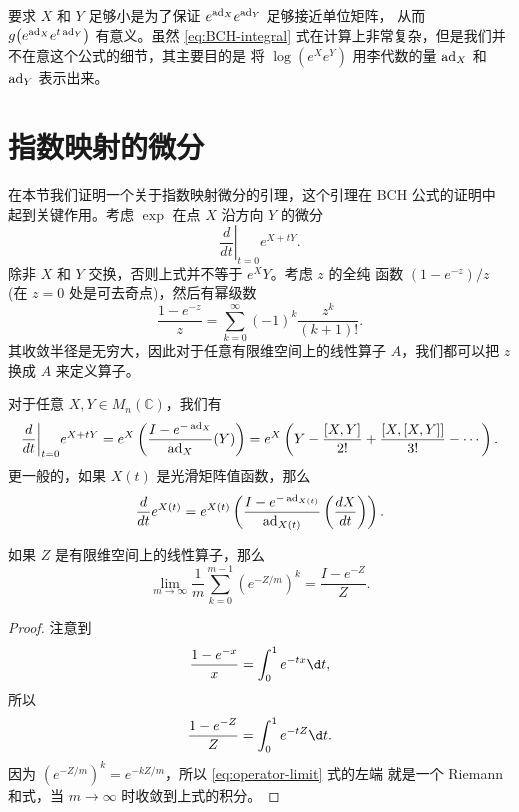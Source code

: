 要求 $X$ 和 $Y$ 足够小是为了保证 $e^{\operatorname{ad}_X}e^{\operatorname{ad}_Y}$ 足够接近单位矩阵，
从而 $g\bigl(e^{\operatorname{ad}_X}e^{t\operatorname{ad}_Y}\bigr)$ 有意义。虽然 \eqref{eq:BCH-integral}
式在计算上非常复杂，但是我们并不在意这个公式的细节，其主要目的是
将 $\log(e^Xe^Y)$ 用李代数的量 $\operatorname{ad}_X$ 和 $\operatorname{ad}_Y$ 表示出来。

\section{指数映射的微分}

在本节我们证明一个关于指数映射微分的引理，这个引理在 BCH 公式的证明中
起到关键作用。考虑 $\exp$ 在点 $X$ 沿方向 $Y$ 的微分
\begin{equation}\label{eq:exp-diff}
  \left.\frac{d}{dt}\right|_{t=0}e^{X+tY}.
\end{equation}
除非 $X$ 和 $Y$ 交换，否则上式并不等于 $e^XY$。考虑 $z$ 的全纯
函数 $(1-e^{-z})/z$ (在 $z=0$ 处是可去奇点)，然后有幂级数
\[
  \frac{1-e^{-z}}{z}=\sum_{k=0}^\infty (-1)^k\frac{z^k}{(k+1)!}.
\]
其收敛半径是无穷大，因此对于任意有限维空间上的线性算子 $A$，我们都可以把
$z$ 换成 $A$ 来定义算子。

\begin{theorem}[指数映射的导数]\label{thm:exp-derivative}
  对于任意 $X,Y\in M_n(\mathbb{C})$，我们有
  \begin{equation}\label{eq:exp-derivative}
    \frac{d}{dt}\bigg|_{t=0}e^{X+tY}=e^X\left(
      \frac{I-e^{-\operatorname{ad}_X}}{\operatorname{ad}_X}(Y)
    \right)=e^X\left(
      Y-\frac{[X,Y]}{2!}+\frac{[X,[X,Y]]}{3!}-\cdots
    \right).
  \end{equation}
  更一般的，如果 $X(t)$ 是光滑矩阵值函数，那么
  \begin{equation}
    \frac{d}{dt}e^{X(t)}=e^{X(t)}\left(
      \frac{I-e^{-\operatorname{ad}_{X(t)}}}{\operatorname{ad}_{X(t)}}\left(
        \frac{dX}{dt}
      \right)
    \right).
  \end{equation}
\end{theorem}

\begin{lemma}
  如果 $Z$ 是有限维空间上的线性算子，那么
  \begin{equation}\label{eq:operator-limit}
    \lim_{m\to\infty}\frac{1}{m}\sum_{k=0}^{m-1}(e^{-Z/m})^k=\frac{I-e^{-Z}}{Z}.
  \end{equation}
\end{lemma}
\begin{proof}
  注意到 
  \[
    \frac{1-e^{-x}}{x}=\int_0^1 e^{-tx}\d t,
  \]
  所以
  \[
    \frac{1-e^{-Z}}{Z}=\int_0^1 e^{-tZ}\d t.
  \]
  因为 $(e^{-Z/m})^k=e^{-kZ/m}$，所以 \eqref{eq:operator-limit} 式的左端
  就是一个 Riemann 和式，当 $m\to\infty$ 时收敛到上式的积分。
\end{proof}

